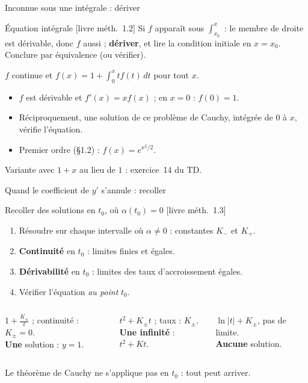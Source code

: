 \documentclass[aspectratio=169,10pt]{beamer}
\DeclareRobustCommand{\livre}[1]{{\sffamily\scriptsize\color{Gris}[livre #1]}}
\newif\ifPT \ifdefined\VERSIONPT \PTtrue \else \PTfalse \fi
\begin{document}
\begin{frame}{Inconnue sous une intégrale : dériver}
\begin{METH}{Équation intégrale \livre{méth.~1.2}}
Si $f$ apparaît sous $\int_{x_0}^x$ : le membre de droite est dérivable, donc $f$ aussi ; \textbf{dériver}, et lire la condition
initiale en $x=x_0$. Conclure par équivalence (ou vérifier).
\end{METH}
\pause
\begin{EX}
$f$ continue et $f(x)=1+\displaystyle\int_0^xtf(t)\,dt$ pour tout $x$.
\begin{itemize}
\item $f$ est dérivable et $f'(x)=xf(x)$ ; en $x=0$ : $f(0)=1$.
\item Réciproquement, une solution de ce problème de Cauchy, intégrée de $0$ à $x$, vérifie l'équation.
\item Premier ordre (§1.2) : $f(x)=e^{x^2/2}$.
\end{itemize}
\end{EX}
{\small\color{Gris}Variante avec $1+x$ au lieu de $1$ : exercice~14 du TD.}
\end{frame}

\ifPT
\begin{frame}{Quand le coefficient de $y'$ s'annule : recoller}
\begin{METH}{Recoller des solutions en $t_0$, où $\alpha(t_0)=0$ \livre{méth.~1.3}}
\begin{enumerate}
\item Résoudre sur chaque intervalle où $\alpha\neq0$ : constantes $K_-$ et $K_+$.
\item \textbf{Continuité} en $t_0$ : limites finies et égales.
\item \textbf{Dérivabilité} en $t_0$ : limites des taux d'accroissement égales.
\item Vérifier l'équation \emph{au point} $t_0$.
\end{enumerate}
\end{METH}
\pause
\begin{columns}[T]
\begin{EX}[$ty'+y=1$]
$1+\frac{K_\pm}t$ ; continuité : $K_\pm=0$.\\ \textbf{Une} solution : $y=1$.
\end{EX}
\begin{EX}[$ty'-y=t^2$]
$t^2+K_\pm t$ ; taux : $K_\pm$.\\ \textbf{Une infinité} : $t^2+Kt$.
\end{EX}
\begin{EX}[$ty'=1$]
$\ln|t|+K_\pm$, pas de limite.\\ \textbf{Aucune} solution.
\end{EX}
\end{columns}
{\small Le théorème de Cauchy ne s'applique pas en $t_0$ : tout peut arriver.}
\end{frame}
\end{document}

